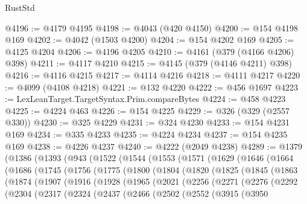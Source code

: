 \begin{lexlean}{RustStd}
\begin{coremodule}
{\begin{coremodule}
{{{{{{{{{{{{{{{{{{{{{{{{{{{{{{{{{{{{{{{{{{{{{{{{{{{{{{{{{{{{{{{{{{{{{{{{{{{{{{{{@4196 := @4179 @4195
@4198 := @4043 (@420 @4150)
@4200 := @154 @4198 @169
@4202 := @4042 (@1503 @4200)
@4204 := @154 @4202 @169
@4205 := @4125 @4204
@4206 := @4196 @4205
@4210 := @4161 (@379 (@4166 @4206) @398)
@4211 := @4117 @4210
@4215 := @4145 (@379 (@4146 @4211) @398)
@4216 := @4116 @4215
@4217 := @4114 @4216
@4218 := @4111 @4217
@4220 := @4099 (@4108 @4218)
@4221 := @132 @4220
@4222 := @456 @1697
@4223 := LexLeanTarget.TargetSyntax.Prim.compareBytes
@4224 := @458 @4223
@4225 := @4224 @463
@4226 := @154 @4225
@4229 := @326 (@329 (@2557 @330))
@4230 := @325 @4229
@4231 := @324 @4230
@4233 := @154 @4231 @169
@4234 := @335 @4233
@4235 := @4224 @4234
@4237 := @154 @4235 @169
@4238 := @4226 @4237
@4240 := @4222 (@2049 @4238)
@4289 := @1379
    (@1386
      (@1393
        (@943
          (@1522
            (@1544
              (@1553
                (@1571
                  (@1629
                    (@1646
                      (@1664
                        (@1686
                          (@1745
                            (@1756
                              (@1775
                                (@1800
                                  (@1804
                                    (@1820
                                      (@1825
                                        (@1845
                                          (@1863
                                            (@1874
                                              (@1907
                                                (@1916
                                                  (@1928
                                                    (@1965
                                                      (@2021
                                                        (@2256
                                                          (@2271
                                                            (@2276
                                                              (@2292
                                                                (@2304
                                                                  (@2317
                                                                    (@2324
                                                                      (@2437
                                                                        (@2466
                                                                          (@2502
                                                                            (@2552
                                                                              (@3915
                                                                                (@3950
}}}}}}}}}}}}}}}}}}}}}}}}}}}}}}}}}}}}}}}}}}}}}}}}}}}}}}}}}}}}}}}}}}}}}}}}}}}}}}}}
\end{coremodule}}
\end{coremodule}
\end{lexlean}
